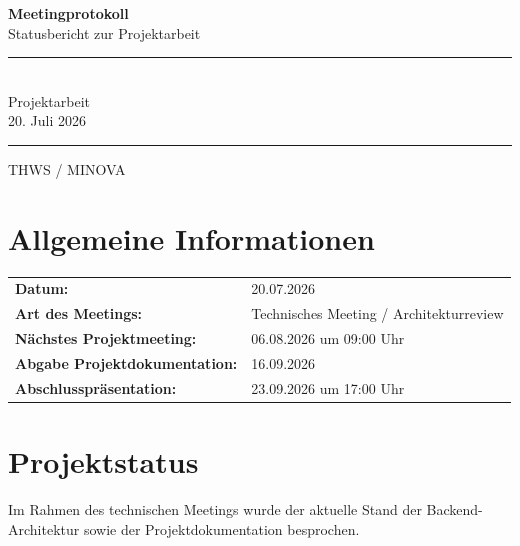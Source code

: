 \documentclass[a4paper,11pt]{article}
\begin{document}

\begin{titlepage}
    \centering

    \vspace*{3cm}

    {\Huge \textbf{Meetingprotokoll}}\\[0.5cm]
    {\Large Statusbericht zur Projektarbeit}\\[2cm]

    \rule{12cm}{0.5pt}\\[0.5cm]

    {\Large Projektarbeit}\\[0.3cm]
    {\large 20. Juli 2026}

    \rule{12cm}{0.5pt}

    \vfill

    {\large THWS / MINOVA}

\end{titlepage}


\tableofcontents
\newpage


\section{Allgemeine Informationen}

\begin{tabular}{ll}
\textbf{Datum:} & 20.07.2026 \\
\textbf{Art des Meetings:} & Technisches Meeting / Architekturreview \\
\textbf{Nächstes Projektmeeting:} & 06.08.2026 um 09:00 Uhr \\
\textbf{Abgabe Projektdokumentation:} & 16.09.2026 \\
\textbf{Abschlusspräsentation:} & 23.09.2026 um 17:00 Uhr \\
\end{tabular}

\vspace{1cm}

\section{Projektstatus}

Im Rahmen des technischen Meetings wurde der aktuelle Stand der Backend-Architektur sowie der Projektdokumentation besprochen.
\end{document}
